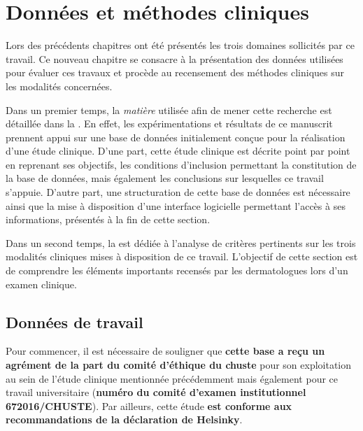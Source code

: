 \renewcommand{\thechapter}{\arabic{chapter}}
\setcounter{chapter}{3}

\chapter{Données et méthodes cliniques}
\label{chap:chapter_4}
\chapterintro
Lors des précédents chapitres ont été présentés les trois domaines sollicités par ce travail. Ce nouveau chapitre se consacre à la présentation des données utilisées pour évaluer ces travaux et procède au recensement des méthodes cliniques sur les modalités concernées.\par

Dans un premier temps, la \textit{matière} utilisée afin de mener cette recherche est détaillée dans la . En effet, les expérimentations et résultats de ce manuscrit prennent appui sur une base de données initialement conçue pour la réalisation d'une étude clinique.  D’une part, cette étude clinique est décrite point par point en reprenant ses objectifs, les conditions d'inclusion permettant la constitution de la base de données, mais également les conclusions sur lesquelles ce travail s'appuie. D’autre part, une structuration de cette base de données est nécessaire ainsi que la mise à disposition d’une interface logicielle permettant l’accès à ses informations, présentés à la fin de cette section.\par

Dans un second temps, la  est dédiée à l’analyse de critères pertinents sur les trois modalités cliniques mises à disposition de ce travail. L'objectif de cette section est de comprendre les éléments importants recensés par les dermatologues lors d'un examen clinique.\par
\newpage

\section{Données de travail}
\label{sec:clinical_data}
Pour commencer, il est nécessaire de souligner que \textbf{cette base a reçu un agrément de la part du comité d'éthique du \acrfull{chuste}} pour son exploitation au sein de l'étude clinique mentionnée précédemment mais également pour ce travail universitaire (\textbf{numéro du comité d'examen institutionnel 672016/CHUSTE}). Par ailleurs, cette étude \textbf{est conforme aux recommandations de la déclaration de Helsinky}.\par

